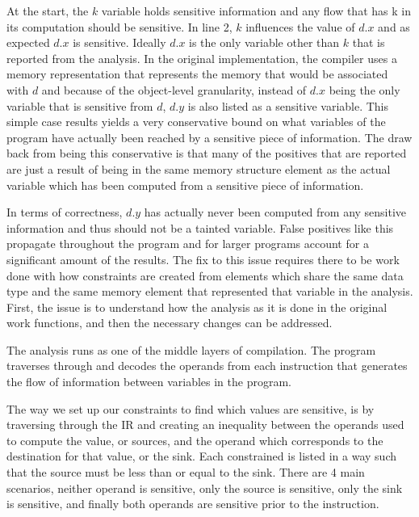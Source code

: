 \documentclass[11pt,a4paper]{article}
\begin{document}
  \begin{algorithm}

  \end{algorithm}

  At the start, the $k$ variable holds sensitive information and any flow that has k
  in its computation should be sensitive. In line 2, $k$ influences the value of $d.x$
  and as expected $d.x$ is sensitive. Ideally $d.x$ is the only variable other
  than $k$ that is reported from the analysis. In the original implementation,
  the compiler uses a memory representation that represents the memory that would
  be associated with $d$ and because of the object-level granularity, instead of
  $d.x$ being the only variable that is sensitive from $d$, $d.y$ is also listed
  as a sensitive variable. This simple case results yields a very conservative
  bound on what variables of the program have actually been reached by a sensitive
  piece of information. The draw back from being this conservative is that many of
  the positives that are reported are just a result of being in the same memory
  structure element as the actual variable which has been computed from a
  sensitive piece of information.


  In terms of correctness, $d.y$ has actually never been computed from any
  sensitive information and thus should not be a tainted variable. False
  positives like this propagate throughout the program and for larger programs
  account for a significant amount of the results. The fix to this issue
  requires there to be work done with how constraints are created from elements
  which share the same data type and the same memory element that represented
  that variable in the analysis. First, the issue is to understand how the
  analysis as it is done in the original work functions, and then the necessary
  changes can be addressed.

  The analysis runs as one of the middle layers of compilation. The program
  traverses through and decodes the operands from each instruction that
  generates the flow of information between variables in the program.

  The way we set up our constraints to find which values are sensitive, is by
  traversing through the IR and creating an inequality between the operands used
  to compute the value, or sources, and the operand which corresponds to the
  destination for that value, or the sink. Each constrained is listed in a way
  such that the source must be less than or equal to the sink. There are 4 main
  scenarios, neither operand is sensitive, only the source is sensitive, only
  the sink is sensitive, and finally both operands are sensitive prior to the
  instruction.
\end{document}
